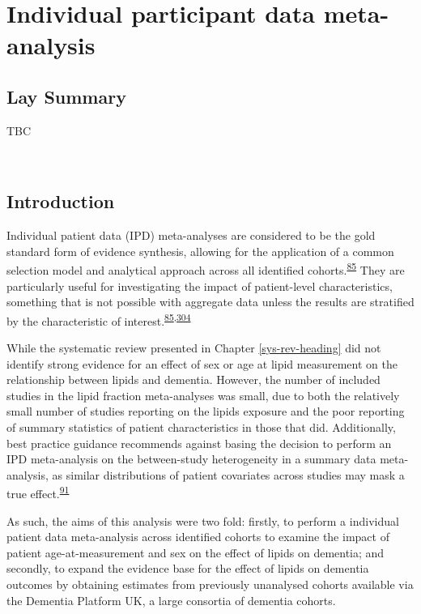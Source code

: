 \documentclass[a4paper, twoside]{templates/ociamthesis}
\begin{document}
\hypertarget{ipd-heading}{%
\chapter{Individual participant data meta-analysis}\label{ipd-heading}}

\minitoc 

\hypertarget{lay-summary-4}{%
\section{Lay Summary}\label{lay-summary-4}}

TBC

~

\hypertarget{introduction-2}{%
\section{Introduction}\label{introduction-2}}

Individual patient data (IPD) meta-analyses are considered to be the gold standard form of evidence synthesis, allowing for the application of a common selection model and analytical approach across all identified cohorts.\textsuperscript{\protect\hyperlink{ref-riley2010}{85}} They are particularly useful for investigating the impact of patient-level characteristics, something that is not possible with aggregate data unless the results are stratified by the characteristic of interest.\textsuperscript{\protect\hyperlink{ref-riley2010}{85},\protect\hyperlink{ref-thompson2005}{304}}

While the systematic review presented in Chapter \ref{sys-rev-heading} did not identify strong evidence for an effect of sex or age at lipid measurement on the relationship between lipids and dementia. However, the number of included studies in the lipid fraction meta-analyses was small, due to both the relatively small number of studies reporting on the lipids exposure and the poor reporting of summary statistics of patient characteristics in those that did. Additionally, best practice guidance recommends against basing the decision to perform an IPD meta-analysis on the between-study heterogeneity in a summary data meta-analysis, as similar distributions of patient covariates across studies may mask a true effect.\textsuperscript{\protect\hyperlink{ref-riley2020}{91}}

As such, the aims of this analysis were two fold: firstly, to perform a individual patient data meta-analysis across identified cohorts to examine the impact of patient age-at-measurement and sex on the effect of lipids on dementia; and secondly, to expand the evidence base for the effect of lipids on dementia outcomes by obtaining estimates from previously unanalysed cohorts available via the Dementia Platform UK, a large consortia of dementia cohorts.
\end{document}
